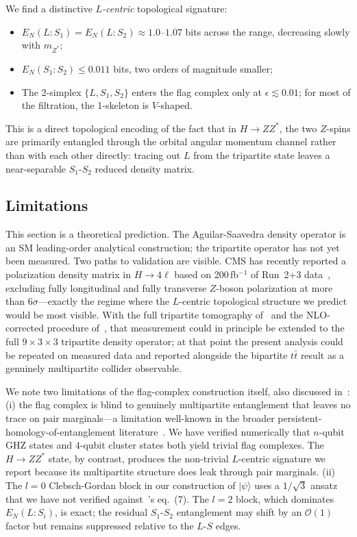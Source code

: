\documentclass[11pt,a4paper]{article}
\theoremstyle{definition}
\begin{document}
We find a distinctive \emph{$L$-centric} topological signature:
\begin{itemize}
\item $E_N(L{:}S_1) = E_N(L{:}S_2) \approx 1.0$--$1.07$ bits across the range, decreasing slowly with $m_{Z^*}$;
\item $E_N(S_1{:}S_2) \leq 0.011$ bits, two orders of magnitude smaller;
\item The 2-simplex $\{L, S_1, S_2\}$ enters the flag complex only at $\epsilon \lesssim 0.01$; for most of the filtration, the 1-skeleton is $V$-shaped.
\end{itemize}
This is a direct topological encoding of the fact that in $H \to ZZ^*$, the two $Z$-spins are primarily entangled through the orbital angular momentum channel rather than with each other directly: tracing out $L$ from the tripartite state leaves a near-separable $S_1$-$S_2$ reduced density matrix.

\subsection{Limitations}

This section is a theoretical prediction. The Aguilar-Saavedra density operator is an SM leading-order analytical construction; the tripartite operator has not yet been measured. Two paths to validation are visible. CMS has recently reported a polarization density matrix in $H \to 4\ell$ based on 200\,fb$^{-1}$ of Run~2+3 data~\cite{CMS-HIG-25-011}, excluding fully longitudinal and fully transverse $Z$-boson polarization at more than $6\sigma$---exactly the regime where the $L$-centric topological structure we predict would be most visible. With the full tripartite tomography of~\cite{AS2024} and the NLO-corrected procedure of~\cite{Pelliccioli2025NLO}, that measurement could in principle be extended to the full $9 \times 3 \times 3$ tripartite density operator; at that point the present analysis could be repeated on measured data and reported alongside the bipartite $t\bar{t}$ result as a genuinely multipartite collider observable.

We note two limitations of the flag-complex construction itself, also discussed in~\cite{Scott2026RWF}: (i) the flag complex is blind to genuinely multipartite entanglement that leaves no trace on pair marginals---a limitation well-known in the broader persistent-homology-of-entanglement literature~\cite{DiPierro2018, HamiltonLeditzky2024}. We have verified numerically that $n$-qubit GHZ states and $4$-qubit cluster states both yield trivial flag complexes. The $H \to ZZ^*$ state, by contrast, produces the non-trivial $L$-centric signature we report because its multipartite structure does leak through pair marginals. (ii) The $l=0$ Clebsch-Gordan block in our construction of $|\psi\rangle$ uses a $1/\sqrt{3}$ ansatz that we have not verified against~\cite{AS2024}'s eq.~(7). The $l=2$ block, which dominates $E_N(L{:}S_i)$, is exact; the residual $S_1$-$S_2$ entanglement may shift by an $\mathcal{O}(1)$ factor but remains suppressed relative to the $L$-$S$ edges.
\end{document}

